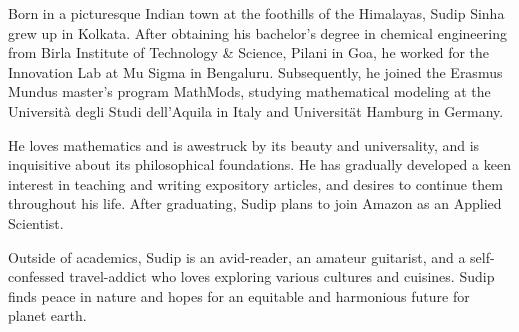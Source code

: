 
Born in a picturesque Indian town at the foothills of the Himalayas, Sudip Sinha grew up in Kolkata. After obtaining his bachelor's degree in chemical engineering from Birla Institute of Technology \& Science, Pilani in Goa, he worked for the Innovation Lab at Mu Sigma in Bengaluru. Subsequently, he joined the Erasmus Mundus master's program MathMods, studying mathematical modeling at the Università degli Studi dell'Aquila in Italy and Universität Hamburg in Germany.

He loves mathematics and is awestruck by its beauty and universality, and is inquisitive about its philosophical foundations. He has gradually developed a keen interest in teaching and writing expository articles, and desires to continue them throughout his life. After graduating, Sudip plans to join Amazon as an Applied Scientist.

Outside of academics, Sudip is an avid-reader, an amateur guitarist, and a self-confessed travel-addict who loves exploring various cultures and cuisines. Sudip finds peace in nature and hopes for an equitable and harmonious future for planet earth.
